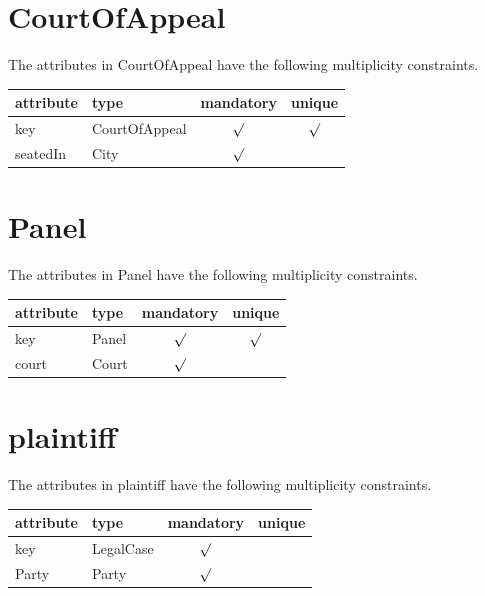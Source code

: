 \documentclass[10pt,a4paper]{report}              %
\theoremstyle{plain}\theorembodyfont{\rmfamily}\newtheorem{definition}{Definition}[section]
\theoremstyle{plain}\theorembodyfont{\rmfamily}\newtheorem{designrule}[definition]{Requirement}
\begin{document}
\section{CourtOfAppeal}

\label{sct:plug CourtOfAppeal}

The attributes in CourtOfAppeal have the following multiplicity constraints. 

\begin{center}
\begin{tabular}{llcc}
attribute & type & mandatory & unique\\
\hline
key  & CourtOfAppeal & $\surd$ & $\surd$\\
seatedIn & City & $\surd$ & \\
\end{tabular}
\end{center}

\section{Panel}

\label{sct:plug Panel}

The attributes in Panel have the following multiplicity constraints. 

\begin{center}
\begin{tabular}{llcc}
attribute & type & mandatory & unique\\
\hline
key  & Panel & $\surd$ & $\surd$\\
court & Court & $\surd$ & \\
\end{tabular}
\end{center}

\section{plaintiff}

\label{sct:plug plaintiff}

The attributes in plaintiff have the following multiplicity constraints. 

\begin{center}
\begin{tabular}{llcc}
attribute & type & mandatory & unique\\
\hline
key  & LegalCase & $\surd$ & \\
Party & Party & $\surd$ & \\
\end{tabular}
\end{center}
\end{document}
